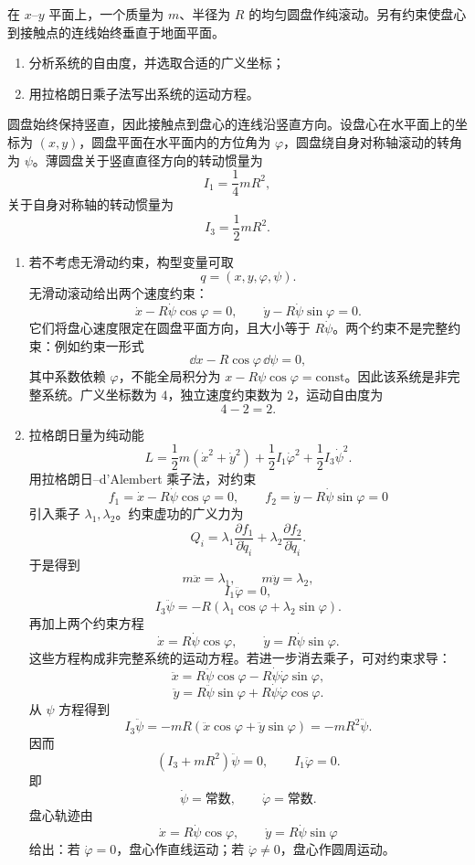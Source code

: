\begin{question}[圆盘的非完整约束]
在 $x$--$y$ 平面上，一个质量为 $m$、半径为 $R$ 的均匀圆盘作纯滚动。另有约束使盘心到接触点的连线始终垂直于地面平面。
\begin{enumerate}
  \item 分析系统的自由度，并选取合适的广义坐标；
  \item 用拉格朗日乘子法写出系统的运动方程。
\end{enumerate}

\begin{solution}
圆盘始终保持竖直，因此接触点到盘心的连线沿竖直方向。设盘心在水平面上的坐标为 $(x,y)$，圆盘平面在水平面内的方位角为 $\varphi$，圆盘绕自身对称轴滚动的转角为 $\psi$。薄圆盘关于竖直直径方向的转动惯量为
\[
  I_1=\frac14mR^2,
\]
关于自身对称轴的转动惯量为
\[
  I_3=\frac12mR^2.
\]

\begin{enumerate}
  \item 若不考虑无滑动约束，构型变量可取
  \[
    q=(x,y,\varphi,\psi).
  \]
  无滑动滚动给出两个速度约束：
  \[
    \dot x-R\dot\psi\cos\varphi=0,
    \qquad
    \dot y-R\dot\psi\sin\varphi=0.
  \]
  它们将盘心速度限定在圆盘平面方向，且大小等于 $R\dot\psi$。两个约束不是完整约束：例如约束一形式
  \[
    \dd x-R\cos\varphi\,\dd\psi=0,
  \]
  其中系数依赖 $\varphi$，不能全局积分为 $x-R\psi\cos\varphi=\mathrm{const}$。因此该系统是非完整系统。广义坐标数为 $4$，独立速度约束数为 $2$，运动自由度为
  \[
    4-2=2.
  \]

  \item 拉格朗日量为纯动能
  \[
    L=\frac12m(\dot x^2+\dot y^2)
      +\frac12I_1\dot\varphi^2+\frac12I_3\dot\psi^2.
  \]
  用拉格朗日--d'Alembert 乘子法，对约束
  \[
    f_1=\dot x-R\dot\psi\cos\varphi=0,
    \qquad
    f_2=\dot y-R\dot\psi\sin\varphi=0
  \]
  引入乘子 $\lambda_1,\lambda_2$。约束虚功的广义力为
  \[
    Q_i=\lambda_1\frac{\partial f_1}{\partial\dot q_i}
        +\lambda_2\frac{\partial f_2}{\partial\dot q_i}.
  \]
  于是得到
  \[
    m\ddot x=\lambda_1,
    \qquad
    m\ddot y=\lambda_2,
  \]
  \[
    I_1\ddot\varphi=0,
  \]
  \[
    I_3\ddot\psi=-R(\lambda_1\cos\varphi+
    \lambda_2\sin\varphi).
  \]
  再加上两个约束方程
  \[
    \dot x=R\dot\psi\cos\varphi,
    \qquad
    \dot y=R\dot\psi\sin\varphi.
  \]
  这些方程构成非完整系统的运动方程。若进一步消去乘子，可对约束求导：
  \[
    \ddot x=R\ddot\psi\cos\varphi-R\dot\psi\dot\varphi\sin\varphi,
  \]
  \[
    \ddot y=R\ddot\psi\sin\varphi+R\dot\psi\dot\varphi\cos\varphi.
  \]
  从 $\psi$ 方程得到
  \[
    I_3\ddot\psi=-mR(\ddot x\cos\varphi+\ddot y\sin\varphi)
    =-mR^2\ddot\psi.
  \]
  因而
  \[
    (I_3+mR^2)\ddot\psi=0,
    \qquad I_1\ddot\varphi=0.
  \]
  即
  \[
    \dot\psi=\text{常数},
    \qquad
    \dot\varphi=\text{常数}.
  \]
  盘心轨迹由
  \[
    \dot x=R\dot\psi\cos\varphi,
    \qquad
    \dot y=R\dot\psi\sin\varphi
  \]
  给出：若 $\dot\varphi=0$，盘心作直线运动；若 $\dot\varphi\ne0$，盘心作圆周运动。
\end{enumerate}
\end{solution}
\end{question}

